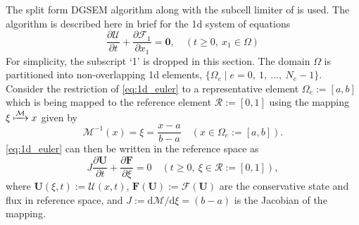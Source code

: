 \documentclass[a4paper,11pt,oneside]{article}
\newcommand{\citear}[1]{\citeauthor{#1} \cite{#1}} %
\newcommand{\vect}[1]{\ensuremath{\boldsymbol{\mathbf{#1}}}} %
\newcommand{\pder}[2]{\frac{\partial #1}{\partial #2}} %
\newcommand{\sdd}{\ensuremath{\text{d}}} %
\newcommand{\defeq}{\ensuremath{:=}} %
\newcommand{\refelemone}{\ensuremath{\mathcal{R}}} %
\newcommand{\elemmapone}{\ensuremath{\mathcal{M}}} %
\newcommand{\eulerphy}[1]{\ensuremath{\mathcal{#1}}} %
\newcommand{\eulerref}[1]{\ensuremath{#1}} %
\begin{document}
The split form DGSEM algorithm along with the subcell limiter of \citear{hennemannRamirezHindenlang2021} is used. The algorithm is described here in brief for the 1d system of equations
\begin{equation}
	\pder{\vect{\eulerphy{U}}}{t} + \pder{\vect{\eulerphy{F}}_1}{x_1} = \vect{0}, \quad (t \geq 0,\ x_1 \in \Omega)
	\label{eq:1d_euler}
\end{equation}
For simplicity, the subscript `1' is dropped in this section. The domain $\Omega$ is partitioned into non-overlapping 1d elements, $\{\Omega_e \mid e=0,\ 1,\ \ldots,\ N_e-1\}$. Consider the restriction of \cref{eq:1d_euler} to a representative element $\Omega_e \defeq [a,b]$ which is being mapped to the reference element $\refelemone \defeq [0,1]$ using the mapping $\xi \xmapsto{\elemmapone} x$ given by
\begin{equation}
	\elemmapone^{-1}(x) = \xi = \frac{x-a}{b-a} \quad (x \in \Omega_e \defeq [a,b]).
	\label{eq:1d_element_mapping}
\end{equation}
\cref{eq:1d_euler} can then be written in the reference space as
\begin{equation}
	J \pder{\vect{\eulerref{U}}}{t} + \pder{\vect{\eulerref{F}}}{\xi} = 0 \quad (t \geq 0,\ \xi \in \refelemone \defeq [0,1]),
	\label{eq:1d_euler_refelem}
\end{equation}
where $\vect{\eulerref{U}}(\xi,t) \defeq \vect{\eulerphy{U}}(x,t)$, $\vect{\eulerref{F}}(\vect{\eulerref{U}}) \defeq \vect{\eulerphy{F}}(\vect{\eulerref{U}})$ are the conservative state and flux in reference space, and $J \defeq \sdd \elemmapone/\sdd \xi = (b-a)$ is the Jacobian of the mapping.
\end{document}
